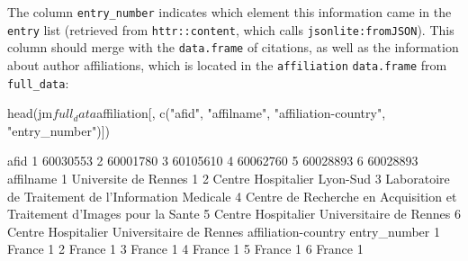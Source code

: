 \begin{Schunk}
\end{Schunk}

The column \texttt{entry\_number} indicates which element this
information came in the \texttt{entry} list (retrieved from
\texttt{httr::content}, which calls \texttt{jsonlite:fromJSON}). This
column should merge with the \texttt{data.frame} of citations, as well
as the information about author affiliations, which is located in the
\texttt{affiliation} \texttt{data.frame} from \texttt{full\_data}:

\begin{Schunk}
\begin{Sinput}
head(jm$full_data$affiliation[, c("afid", "affilname", "affiliation-country", "entry_number")])
\end{Sinput}
\begin{Soutput}
      afid
1 60030553
2 60001780
3 60105610
4 60062760
5 60028893
6 60028893
                                                                affilname
1                                                  Universite de Rennes 1
2                                             Centre Hospitalier Lyon-Sud
3                     Laboratoire de Traitement de l'Information Medicale
4 Centre de Recherche en Acquisition et Traitement d'Images pour la Sante
5                              Centre Hospitalier Universitaire de Rennes
6                              Centre Hospitalier Universitaire de Rennes
  affiliation-country entry_number
1              France            1
2              France            1
3              France            1
4              France            1
5              France            1
6              France            1
\end{Soutput}
\end{Schunk}

